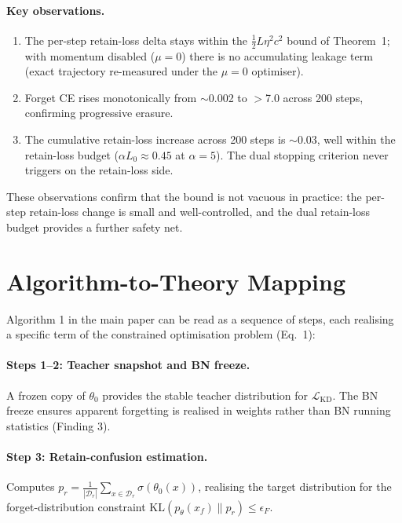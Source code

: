 \documentclass[letterpaper]{article}
\newcommand{\KL}{\mathrm{KL}}
\newcommand{\Dr}{\mathcal{D}_r}
\newcommand{\losskd}{\mathcal{L}_{\mathrm{KD}}}
\begin{document}
\paragraph{Key observations.}
\begin{enumerate}[nosep]
\item The per-step retain-loss delta stays within the $\tfrac{1}{2}L\eta^2 c^2$ bound of Theorem~1; with momentum disabled ($\mu{=}0$) there is no accumulating leakage term (exact trajectory re-measured under the $\mu{=}0$ optimiser).
\item Forget CE rises monotonically from $\sim$0.002 to $>$7.0 across 200 steps, confirming progressive erasure.
\item The cumulative retain-loss increase across 200 steps is $\sim$0.03, well within the retain-loss budget ($\alpha L_0 \approx 0.45$ at $\alpha = 5$). The dual stopping criterion never triggers on the retain-loss side.
\end{enumerate}

These observations confirm that the bound is not vacuous in practice: the per-step retain-loss change is small and well-controlled, and the dual retain-loss budget provides a further safety net.

\section{Algorithm-to-Theory Mapping}

Algorithm 1 in the main paper can be read as a sequence of steps, each realising a specific term of the constrained optimisation problem (Eq.~1):

\paragraph{Steps 1--2: Teacher snapshot and BN freeze.}
A frozen copy of $\theta_0$ provides the stable teacher distribution for $\losskd$. The BN freeze ensures apparent forgetting is realised in weights rather than BN running statistics (Finding 3).

\paragraph{Step 3: Retain-confusion estimation.}
Computes $p_r = \frac{1}{|\Dr|}\sum_{x \in \Dr}\sigma(\theta_0(x))$, realising the target distribution for the forget-distribution constraint $\KL(p_\theta(x_f)\|p_r) \le \epsilon_F$.
\end{document}
